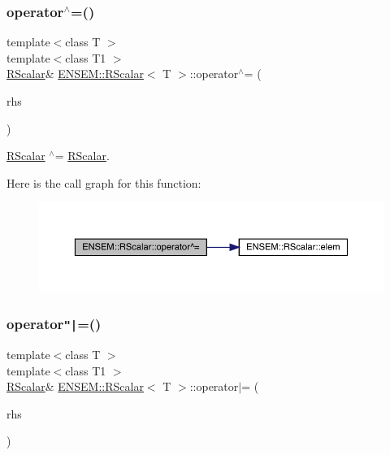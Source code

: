 \subsubsection{\texorpdfstring{operator$^\wedge$=()}{operator^=()}\hspace{0.1cm}{\footnotesize\ttfamily [3/3]}}
{\footnotesize\ttfamily template$<$class T $>$ \\
template$<$class T1 $>$ \\
\mbox{\hyperlink{classENSEM_1_1RScalar}{R\+Scalar}}\& \mbox{\hyperlink{classENSEM_1_1RScalar}{E\+N\+S\+E\+M\+::\+R\+Scalar}}$<$ T $>$\+::operator$^\wedge$= (\begin{DoxyParamCaption}\item[{const \mbox{\hyperlink{classENSEM_1_1RScalar}{R\+Scalar}}$<$ T1 $>$ \&}]{rhs }\end{DoxyParamCaption})\hspace{0.3cm}{\ttfamily [inline]}}



\mbox{\hyperlink{classENSEM_1_1RScalar}{R\+Scalar}} $^\wedge$= \mbox{\hyperlink{classENSEM_1_1RScalar}{R\+Scalar}}. 

Here is the call graph for this function\+:
\nopagebreak
\begin{figure}[H]
\begin{center}
\leavevmode
\includegraphics[width=350pt]{d0/d8c/classENSEM_1_1RScalar_ad69bdf7cec58f8ef8a8a42b250d97b25_cgraph}
\end{center}
\end{figure}
\mbox{\label{classENSEM_1_1RScalar_ad5838d1c3d7169f6cc7f9b78fe42ac59}} 
\subsubsection{\texorpdfstring{operator\texttt{"|}=()}{operator|=()}\hspace{0.1cm}{\footnotesize\ttfamily [1/3]}}
{\footnotesize\ttfamily template$<$class T $>$ \\
template$<$class T1 $>$ \\
\mbox{\hyperlink{classENSEM_1_1RScalar}{R\+Scalar}}\& \mbox{\hyperlink{classENSEM_1_1RScalar}{E\+N\+S\+E\+M\+::\+R\+Scalar}}$<$ T $>$\+::operator$\vert$= (\begin{DoxyParamCaption}\item[{const \mbox{\hyperlink{classENSEM_1_1RScalar}{R\+Scalar}}$<$ T1 $>$ \&}]{rhs }\end{DoxyParamCaption})\hspace{0.3cm}{\ttfamily [inline]}}




